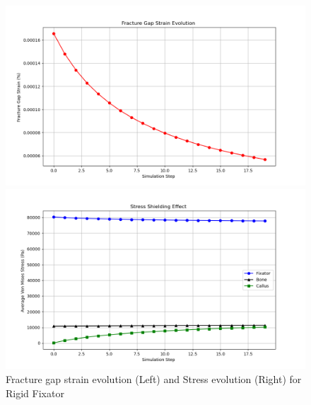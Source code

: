 \documentclass{article}
\begin{document}
\begin{figure}[htbp]
  \centering
  \begin{minipage}{0.45\textwidth}
    \centering
    \includegraphics[width=\textwidth]{../output_advanced/Rigid/gap_strain.png}
  \end{minipage}
  \hfill
  \begin{minipage}{0.45\textwidth}
    \centering
    \includegraphics[width=\textwidth]{../output_advanced/Rigid/stress_shielding.png}
  \end{minipage}
  \caption{Fracture gap strain evolution (Left) and Stress evolution (Right) for Rigid Fixator}
  \label{fig:rigid_gap_strain_stress_shielding}
\end{figure}
\end{document}
